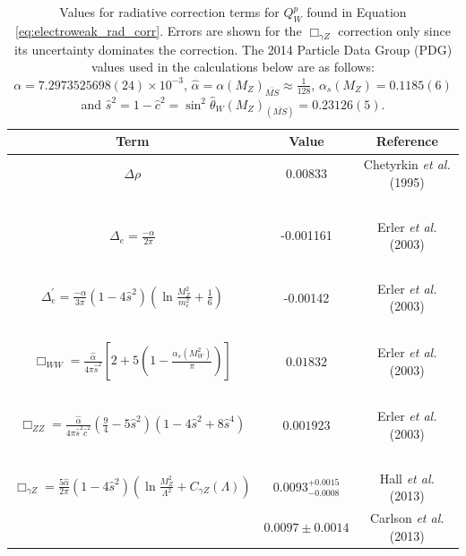 \begin{table}
\begin{center}
\caption{Values for radiative correction terms for $Q_W^p$ found in Equation \ref{eq:electroweak_rad_corr}. Errors are shown for the $\Box_{\gamma Z}$ correction only since its uncertainty dominates the correction. The 2014 Particle Data Group (PDG) values used in the calculations below are as follows: $\alpha = 7.2973525698(24)\times 10^{-3}$, $\hat{\alpha}=\alpha(M_Z)_{\overline{MS}}\approx\frac{1}{128}$,  $\alpha_s(M_Z)=0.1185(6)$ and $\hat s^2=1-\hat c^2=\sin^2\hat{\theta}_W(M_Z)_{(\overline{MS})}=0.23126(5)$.}
\label{tab:ew_corrections}
\begin{tabular}{c|c|c}\hline
Term & Value & Reference\\\hline
$\Delta\rho$ & $0.00833$ & Chetyrkin {\it et al.} (1995) \cite{Chetyrkin1995}\\~&~&~\\
$\Delta_e=\frac{-\alpha}{2\pi}$ & -0.001161 & Erler {\it et al.} (2003) \cite{Erler2003}\\~&~&~\\
$\Delta_e^{\prime}=\frac{-\alpha}{3\pi}(1-4\hat{s}^2)\left(\ln{\frac{M_Z^2}{m_e^2}}+\frac{1}{6}\right)$ & -0.00142 & Erler {\it et al.} (2003) \cite{Erler2003}\\~&~&~\\
$\Box_{WW}=\frac{\hat{\alpha}}{4\pi\hat{s}^2}\left[2+5\left(1-\frac{\alpha_s(M_W^2)}{\pi}\right)\right]$ & $0.01832$ & Erler {\it et al.} (2003) \cite{Erler2003}\\~&~&~\\
$\Box_{ZZ}=\frac{\hat{\alpha}}{4\pi\hat{s}^2\hat{c}^2}\left(\frac{9}{4}-5\hat s^2\right)(1-4\hat s^2 +8\hat s^4)$ & $0.001923$ & Erler {\it et al.} (2003) \cite{Erler2003}\\~&~&~\\
$\Box_{\gamma Z}=\frac{5\hat{\alpha}}{2\pi}(1-4\hat{s}^2)\left(\ln{\frac{M_Z^2}{\Lambda^2}}+C_{\gamma Z}(\Lambda)\right)$ & $0.0093_{-0.0008}^{+0.0015}$ & Hall {\it et al.} (2013) \cite{Hall2013}\\
~& $0.0097\pm0.0014$ & Carlson {\it et al.} (2013) \cite{Carlson2013}\\
\hline
\end{tabular}
\end{center}
\end{table}

